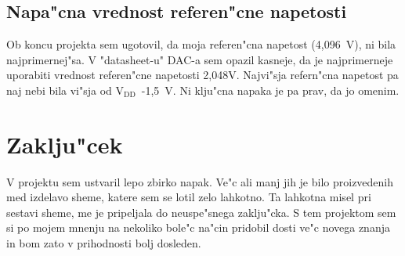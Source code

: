 \documentclass[a4paper]{article}
\begin{document}
\subsection{Napa"cna vrednost referen"cne napetosti}

Ob koncu projekta sem ugotovil, da moja referen"cna napetost (4,096~V), ni bila najprimernej"sa. V "\mbox{datasheet-u}" DAC-a sem opazil kasneje, da je najprimerneje uporabiti vrednost referen"cne napetosti 2,048V. Najvi"sja refern"cna napetost pa naj nebi bila vi"sja od $\mathrm{V_{DD}}$~-1,5~V. Ni klju"cna napaka je pa prav, da jo omenim.
	
	
\section{Zaklju"cek}


	V projektu sem ustvaril lepo zbirko napak. Ve"c ali manj jih je bilo proizvedenih med izdelavo sheme, katere sem se lotil zelo lahkotno. Ta lahkotna misel pri sestavi sheme, me je pripeljala do neuspe"snega zaklju"cka. S tem projektom sem si po mojem mnenju na nekoliko bole"c na"cin pridobil dosti ve"c novega znanja in bom zato v prihodnosti bolj dosleden. 
	
	
\newpage

\pagestyle{empty}
	
	
	
	
\newpage
\pagestyle{fancy}
\end{document}
